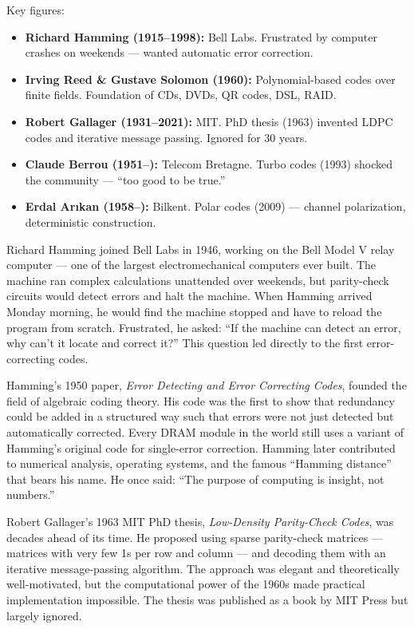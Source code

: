 Key figures:
\begin{itemize}
\item \textbf{Richard Hamming (1915--1998):} Bell Labs. Frustrated by computer crashes on weekends — wanted automatic error correction.
\item \textbf{Irving Reed \& Gustave Solomon (1960):} Polynomial-based codes over finite fields. Foundation of CDs, DVDs, QR codes, DSL, RAID.
\item \textbf{Robert Gallager (1931--2021):} MIT. PhD thesis (1963) invented LDPC codes and iterative message passing. Ignored for 30 years.
\item \textbf{Claude Berrou (1951--):} Telecom Bretagne. Turbo codes (1993) shocked the community — ``too good to be true.''
\item \textbf{Erdal Arıkan (1958--):} Bilkent. Polar codes (2009) — channel polarization, deterministic construction.
\end{itemize}

Richard Hamming joined Bell Labs in 1946, working on the Bell Model V relay computer — one of the largest electromechanical computers ever built. The machine ran complex calculations unattended over weekends, but parity-check circuits would detect errors and halt the machine. When Hamming arrived Monday morning, he would find the machine stopped and have to reload the program from scratch. Frustrated, he asked: ``If the machine can detect an error, why can't it locate and correct it?'' This question led directly to the first error-correcting codes.

Hamming's 1950 paper, \emph{Error Detecting and Error Correcting Codes}, founded the field of algebraic coding theory. His code was the first to show that redundancy could be added in a structured way such that errors were not just detected but automatically corrected. Every DRAM module in the world still uses a variant of Hamming's original code for single-error correction. Hamming later contributed to numerical analysis, operating systems, and the famous ``Hamming distance'' that bears his name. He once said: ``The purpose of computing is insight, not numbers.''

Robert Gallager's 1963 MIT PhD thesis, \emph{Low-Density Parity-Check Codes}, was decades ahead of its time. He proposed using sparse parity-check matrices — matrices with very few 1s per row and column — and decoding them with an iterative message-passing algorithm. The approach was elegant and theoretically well-motivated, but the computational power of the 1960s made practical implementation impossible. The thesis was published as a book by MIT Press but largely ignored.

